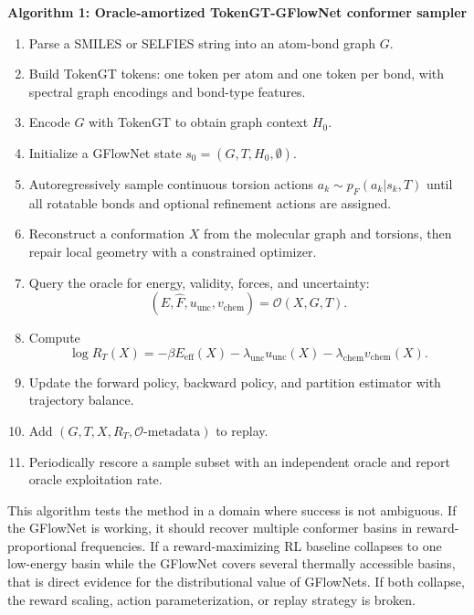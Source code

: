 \documentclass[11pt]{article}
\newcommand{\oracle}{\mathcal{O}}
\begin{document}
\begin{center}
\begin{minipage}{0.93\linewidth}
\textbf{Algorithm 1: Oracle-amortized TokenGT-GFlowNet conformer sampler}
\begin{enumerate}[leftmargin=2em]
  \item Parse a SMILES or SELFIES string into an atom-bond graph $G$.
  \item Build TokenGT tokens: one token per atom and one token per bond, with spectral graph encodings and bond-type features.
  \item Encode $G$ with TokenGT to obtain graph context $H_0$.
  \item Initialize a GFlowNet state $s_0=(G,T,H_0,\emptyset)$.
  \item Autoregressively sample continuous torsion actions $a_k\sim p_F(a_k|s_k,T)$ until all rotatable bonds and optional refinement actions are assigned.
  \item Reconstruct a conformation $X$ from the molecular graph and torsions, then repair local geometry with a constrained optimizer.
  \item Query the oracle for energy, validity, forces, and uncertainty:
  \[
  (\hat{E},\hat{F},u_{\mathrm{unc}},v_{\mathrm{chem}})=\oracle(X,G,T).
  \]
  \item Compute
  \[
  \log R_T(X)=
  -\beta E_{\mathrm{eff}}(X)
  -\lambda_{\mathrm{unc}}u_{\mathrm{unc}}(X)
  -\lambda_{\mathrm{chem}}v_{\mathrm{chem}}(X).
  \]
  \item Update the forward policy, backward policy, and partition estimator with trajectory balance.
  \item Add $(G,T,X,R_T,\oracle\text{-metadata})$ to replay.
  \item Periodically rescore a sample subset with an independent oracle and report oracle exploitation rate.
\end{enumerate}
\end{minipage}
\end{center}

This algorithm tests the method in a domain where success is not ambiguous. If the GFlowNet is working, it should recover multiple conformer basins in reward-proportional frequencies. If a reward-maximizing RL baseline collapses to one low-energy basin while the GFlowNet covers several thermally accessible basins, that is direct evidence for the distributional value of GFlowNets. If both collapse, the reward scaling, action parameterization, or replay strategy is broken.
\end{document}
